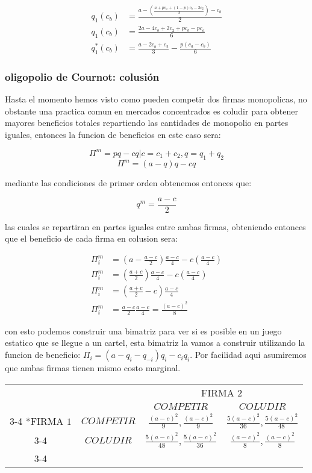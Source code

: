 \documentclass[11pt]{article}
\begin{document}
\begin{flushleft}
    \begin{align*}
        q_1(c_b)&=\frac{a-\left(\frac{a+pc_a+(1-p)c_b-2c_2}{3}\right)-c_{b}}{2}\\
        q_1(c_b)&=\frac{2a-4c_b+2c_2+pc_b-pc_a}{6}\\
        q_1^*(c_b)&=\frac{a-2c_b+c_2}{3}-\frac{p(c_a-c_b)}{6}
    \end{align*}

\subsubsection{oligopolio de Cournot: colusión}

    Hasta el momento hemos visto como pueden competir dos firmas monopolicas, no obstante una practica comun en mercados concentrados es coludir para obtener mayores beneficios totales repartiendo las cantidades de monopolio en partes iguales, entonces la funcion de beneficios en este caso sera:

    $$\Pi^m=pq-cq|c=c_1+c_2,q=q_1+q_2$$
    $$\Pi^m=(a-q)q-cq$$

    mediante las condiciones de primer orden obtenemos entonces que:

    $$q^m=\frac{a-c}{2}$$

    las cuales se repartiran en partes iguales entre ambas firmas, obteniendo entonces que el beneficio de cada firma en colusion sera:

    \begin{align*}
        \Pi^m_i&=\left(a-\frac{a-c}{2}\right)\frac{a-c}{4}-c\left(\frac{a-c}{4}\right)\\
        \Pi^m_i&=\left(\frac{a+c}{2}\right)\frac{a-c}{4}-c\left(\frac{a-c}{4}\right)\\
        \Pi^m_i&=\left(\frac{a+c}{2}-c\right)\frac{a-c}{4}\\
        \Pi^m_i&=\frac{a-c}{2}\frac{a-c}{4}=\frac{(a-c)^2}{8}
    \end{align*}

    con esto podemos construir una bimatriz para ver si es posible en un juego estatico que se llegue a un cartel, esta bimatriz la vamos a construir utilizando la funcion de beneficio: $\Pi_i=(a-q_i-q_{-i})q_i-c_iq_i$. Por facilidad aqui asumiremos que ambas firmas tienen mismo costo marginal.

    \begin{center}    
        \setlength{\extrarowheight}{0pt}
        \begin{tabular}{cc|c|c|}
            & \multicolumn{1}{c}{} & \multicolumn{2}{c}{FIRMA $2$}\\
            & \multicolumn{1}{c}{} & \multicolumn{1}{c}{$COMPETIR$}  & \multicolumn{1}{c}{$COLUDIR$} \\\cline{3-4}
            \multirow{2}*{FIRMA $1$}  & $COMPETIR$ & $\frac{(a-c)^2}{9},\frac{(a-c)^2}{9}$ & $\frac{5(a-c)^2}{36},\frac{5(a-c)^2}{48}$ \\\cline{3-4}
            & $COLUDIR$ & $\frac{5(a-c)^2}{48},\frac{5(a-c)^2}{36}$ & $\frac{(a-c)^2}{8},\frac{(a-c)^2}{8}$ \\\cline{3-4}
        \end{tabular}
    \end{center}


\end{flushleft}
\end{document}
